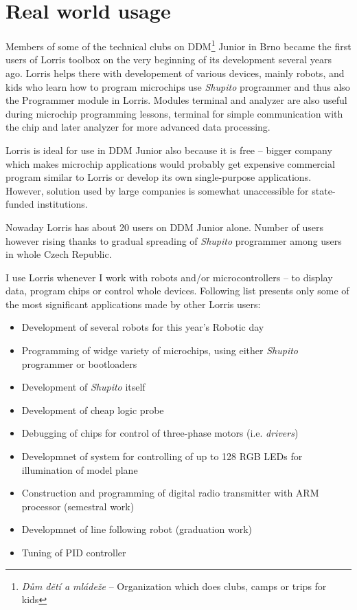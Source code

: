\documentclass[12pt, a4paper, oneside]{article}
\newcommand{\It}{\textit}  %
\begin{document}
\newpage
\section{Real world usage}
\label{usage}
Members of some of the technical clubs on DDM\footnote{\It{Dům dětí a mládeže} -- Organization which does clubs, camps or trips for kids} Junior\cite{junior} in Brno became the first users of Lorris toolbox on the very beginning of its development several years ago. Lorris helps there with developement of various devices, mainly robots, and kids who learn how to program microchips use \It{Shupito} programmer and thus also the Programmer module in Lorris. Modules terminal and analyzer are also useful during microchip programming lessons, terminal for simple communication with the chip and later analyzer for more advanced data processing.

Lorris is ideal for use in DDM Junior also because it is free -- bigger company which makes microchip applications would probably get expensive commercial program similar to Lorris or develop its own single-purpose applications. However, solution used by large companies is somewhat unaccessible for state-funded institutions.

Nowaday Lorris has about 20 users on DDM Junior alone. Number of users however rising thanks to gradual spreading of \It{Shupito} programmer among users in whole Czech Republic.

\vspace{10mm}

\noindent I use Lorris whenever I work with robots and/or microcontrollers -- to display data, program chips or control whole devices. Following list presents only some of the most significant applications made by other Lorris users:
\begin{itemize}
    \item Development of several robots for this year's Robotic day\cite{rob_den_new}
    \item Programming of widge variety of microchips, using either \It{Shupito} programmer or bootloaders
    \item Development of \It{Shupito} itself
    \item Development of cheap logic probe
    \item Debugging of chips for control of three-phase motors (i.e. \It{drivers})
    \item Developmnet of system for controlling of up to 128 RGB LEDs for illumination of model plane
    \item Construction and programming of digital radio transmitter with ARM processor (semestral work)
    \item Developmnet of line following robot (graduation work)
    \item Tuning of PID controller
\end{itemize}
\end{document}
